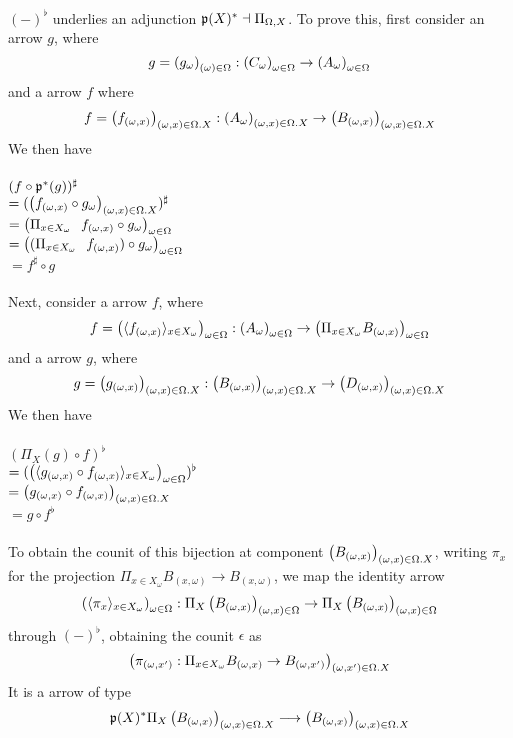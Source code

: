 \documentclass[sigplan,10pt,review,anonymous]{acmart}
\newcommand{\fm}[2]{
\left(
\tiny
#1
\normalsize
\right)_{#2}
}
\begin{document}
$(-)^\flat$ underlies an adjunction $\frak p(X)^* \dashv \Pi_{\Omega, X}$. To prove this, first consider an arrow $g$, where $$g = \fm{g_{\omega}}{(\omega) \in \Omega} : \fm{C_{\omega}}{\omega \in \Omega} \to \fm{A_\omega}{\omega \in \Omega}$$
and a arrow $f$ where
$$f = \fm{f_{(\omega,x)}}{(\omega,x) \in \Omega . X} : \fm{A_\omega}{(\omega,x) \in \Omega . X} \to \fm{B_{(\omega, x)}}{(\omega,x) \in \Omega . X}$$
We then have\\~\\
$(f \circ \frak p^*(g))^\sharp$\\
$= ( \fm{f_{(\omega,x)} \circ g_{\omega}}{(\omega,x) \in \Omega.X} )^\sharp$\\
$= \fm{\Pi_{x \in X_{\omega}}~~~f_{(\omega,x)} \circ g_\omega}{\omega \in \Omega}$\\
$= \fm{(\Pi_{x \in X_{\omega}}~~~f_{(\omega,x)}) \circ g_\omega}{\omega \in \Omega}$\\
$= f^\sharp \circ g$\\~\\
Next, consider a arrow $f$, where
$$f = \fm{\langle f_{(\omega,x)} \rangle_{x \in X_\omega}}{\omega \in \Omega} : \fm{A_\omega}{\omega \in \Omega} \to \fm{\Pi_{x \in X_\omega} B_{(\omega,x)}}{\omega \in \Omega}$$
and a arrow $g$, where
$$g = \fm{g_{(\omega,x)}}{(\omega,x) \in \Omega . X} : \fm{B_{(\omega,x)}}{(\omega,x) \in \Omega . X} \to \fm{D_{(\omega,x)}}{(\omega,x) \in \Omega . X}$$
We then have\\~\\
$(\Pi_{X}(g) \circ f)^\flat$\\
$= ( \fm{\langle g_{(\omega, x)} \circ f_{(\omega,x)} \rangle_{x \in X_\omega} }{\omega \in \Omega} )^\flat$\\ 
\vspace{0.5ex}$= \fm{g_{(\omega, x)} \circ f_{(\omega,x)}}{(\omega, x) \in \Omega . X}$\\
$= g \circ f^\flat$\\~\\
To obtain the counit of this bijection at component $\fm{B_{(\omega, x)}}{(\omega,x) \in \Omega.X}$, writing $\pi_x$ for the projection $\Pi_{x \in X_\omega} B_{(x,\omega)} \to B_{(x,\omega)}$, we map the identity arrow $$\fm{\langle \pi_x \rangle_{x \in X_\omega}}{\omega \in \Omega} : \Pi_X \fm{B_{(\omega,x)}}{(\omega,x) \in \Omega} \to \Pi_X \fm{B_{(\omega,x)}}{(\omega,x) \in \Omega}$$ through $(-)^\flat$, obtaining the counit $\epsilon$ as $$\fm{\pi_{(\omega,x')} : \Pi_{x \in X_\omega} B_{(\omega,x)} \to B_{(\omega,x')}}{(\omega,x') \in \Omega . X}$$ It is a arrow of type
$$\frak p(X)^* \Pi_X \fm{B_{(\omega,x)}}{(\omega,x) \in \Omega . X} \longrightarrow \fm{B_{(\omega,x)}}{(\omega,x) \in \Omega . X}$$
\end{document}
